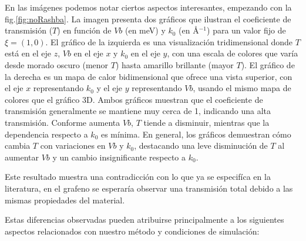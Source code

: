 En las imágenes podemos notar ciertos aspectos interesantes, empezando con la fig.\ref{fig:noRashba}.
La imagen presenta dos gráficos que ilustran el coeficiente de transmisión ($T$) en función de $Vb$ (en meV) y $k_0$ (en \AA$^{-1}$) para un valor fijo de $\xi = (1, 0)$.
El gráfico de la izquierda es una visualización tridimensional donde $T$ está en el eje $z$, $Vb$ en el eje $x$ y $k_0$ en el eje $y$, con una escala de colores que varía desde morado oscuro (menor $T$) hasta amarillo brillante (mayor $T$).
El gráfico de la derecha es un mapa de calor bidimensional que ofrece una vista superior, con el eje $x$ representando $k_0$ y el eje $y$ representando $Vb$, usando el mismo mapa de colores que el gráfico 3D\@.
Ambos gráficos muestran que el coeficiente de transmisión generalmente se mantiene muy cerca de 1, indicando una alta transmisión.
Conforme aumenta $Vb$, $T$ tiende a disminuir, mientras que la dependencia respecto a $k_0$ es mínima.
En general, los gráficos demuestran cómo cambia $T$ con variaciones en $Vb$ y $k_0$, destacando una leve disminución de $T$ al aumentar $Vb$ y un cambio insignificante respecto a $k_0$.

Este resultado muestra una contradicción con lo que ya se especifíca en la literatura, en el grafeno se esperaría observar una transmisión total debido a las mismas propiedades del material\cite{horsell2008, Young2009}.

Estas diferencias observadas pueden atribuirse principalmente a los siguientes aspectos relacionados con nuestro método y condiciones de simulación:

